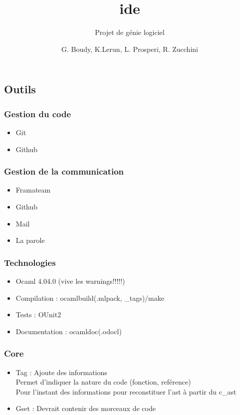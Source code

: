 \documentclass{beamer}
\title{ide}
\subtitle{Projet de génie logiciel}
\author{G. Boudy, K.Lerun, L. Prosperi, R. Zucchini}
\begin{document}
\maketitle

\begin{frame}
    \section{Outils}
    \frametitle{Gestion du code}

    \begin{itemize}
        \item Git
        \item Github
    \end{itemize}
\end{frame}

\begin{frame}
    \frametitle{Gestion de la communication}

    \begin{itemize}
        \item Framateam
        \item Github
        \item Mail
        \item La parole
    \end{itemize}
\end{frame}

\begin{frame}
    \frametitle{Technologies}

    \begin{itemize}
        \item Ocaml 4.04.0 (vive les warnings!!!!!)
        \item Compilation : ocamlbuild(.mlpack, \_tags)/make
        \item Tests : OUnit2
        \item Documentation : ocamldoc(.odocl)
    \end{itemize}
\end{frame}

\begin{frame}
    \frametitle{Core}

    \begin{itemize}
        \item Tag : Ajoute des informations \\
        Permet d'indiquer la nature du code (fonction, reférence) \\
        Pour l'instant des informations pour reconstituer l'ast à partir du c\_ast
        \item Gset : Devrait contenir des morceaux de code
    \end{itemize}
\end{frame}
\end{document}
